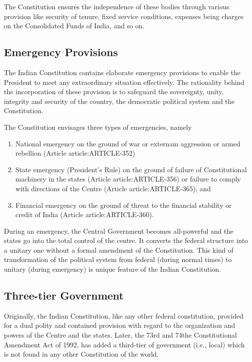 \begin{multicols}{2}
The Constitution ensures the independence of these bodies through various provision like security of tenure, fixed service conditions, expenses being charges on the Consolidated Funds of India, and so on.

\subsection{Emergency Provisions}

The Indian Constitution contains elaborate emergency provisions to enable the President to meet any extraordinary situation effectively. The rationality behind the incorporation of these provision is to safeguard the sovereignty, unity, integrity and security of the country, the democratic political system and the Constitution.

The Constitution envisages three types of emergencies, namely

\renewcommand{\labelenumi}{\textbf{(\alph{enumi})}}
\begin{enumerate}
  \item National emergency on the ground of war or externam aggression or armed rebellion (Article \gls{article:ARTICLE-352})
  \item State emergency (President's Rule) on the ground of failure of Constitutional machinery in the states (Article \gls{article:ARTICLE-356}) or failure to comply with directions of the Centre (Article \gls{article:ARTICLE-365}); and
  \item Financial emergency on the ground of threat to the financial stability or credit of India (Article \gls{article:ARTICLE-360}).
\end{enumerate}

During an emergency, the Central Government becomes all-powerful and the states go into the total control of the centre. It converts the federal structure into a unitary one without a formal amendment of the Constitution. This kind of transformation of the political system from federal (during normal times) to unitary (during emergency) is unique feature of the Indian Constitution.

\subsection{Three-tier Government}

Originally, the Indian Constitution, like any other federal constitution, provided for a dual polity and contained provision with regard to the organization and powers of the Centre and the states. Later, the 73rd and 74the Constitutional Amendment Act of 1992, has added a third-tier of government (i.e., local) which is not found in any other Constitution of the world.


\end{multicols}
